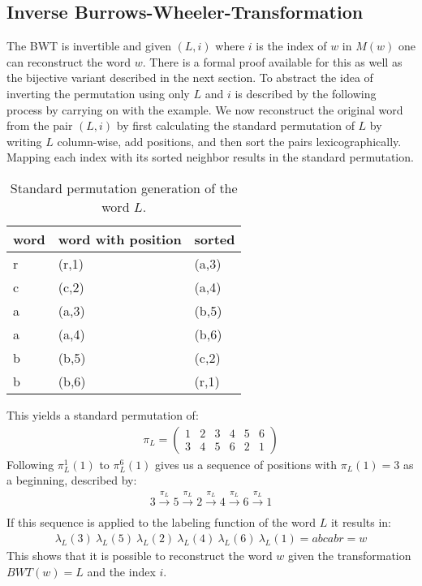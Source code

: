 \subsection{Inverse Burrows-Wheeler-Transformation}
\label{ch:Principles of compression:sec:Other:subSec:bwtInverse}
\par{
 The BWT is invertible and given $(L, i)$ where $i$ is the index of $w$ in $M(w)$ one can reconstruct the word $w$. There is a formal proof \cite{kufleitner2009bijective} available for this as well as the bijective variant described in the next section. To abstract the idea of inverting the permutation using only $L$ and $i$ is described by the following process by carrying on with the example. We now reconstruct the original word from the pair $(L,i)$ by first calculating the standard permutation of $L$ by writing $L$ column-wise, add positions, and then sort the pairs lexicographically. Mapping each index with its sorted neighbor results in the standard permutation.  
 \begin{table}[h]
 	\centering
 	\begin{tabular}{l|l|l}
		word & word with position & sorted\\
		\hline
		r & (r,1) & (a,3) \\
		c & (c,2) & (a,4) \\
		a & (a,3) & (b,5) \\
		a & (a,4) & (b,6) \\
		b & (b,5) & (c,2) \\
		b & (b,6) & (r,1)
 		\label{tab:t11 standard permutation}
 	\end{tabular}
 	\caption{Standard permutation generation of the word $L$.}
 \end{table}
}
\par{
This yields a standard permutation of:
\begin{gather}  
\pi_L = 
\begin{pmatrix} 1 & 2 & 3 & 4 & 5 & 6\\ 3 & 4 & 5 & 6 & 2 & 1 \end{pmatrix}
\end{gather}
Following $\pi^1_L(1)$ to $\pi^6_L(1)$ gives us a sequence of positions with $\pi_L(1)=3$ as a beginning, described by:
\begin{gather} 
3 \xrightarrow[]{\pi_L} 5 \xrightarrow[]{\pi_L} 2 \xrightarrow[]{\pi_L} 4 \xrightarrow[]{\pi_L} 6 \xrightarrow[]{\pi_L} 1 
\end{gather}
If this sequence is applied to the labeling function of the word $L$ it results in: 
\begin{gather}  
\lambda_L(3) \: \lambda_L(5) \: \lambda_L(2) \: \lambda_L(4) \: \lambda_L(6) \: \lambda_L(1)
= abcabr = w
\end{gather}
This shows that it is possible to reconstruct the word $w$ given the transformation $BWT(w)=L$ and the index $i$.
}

